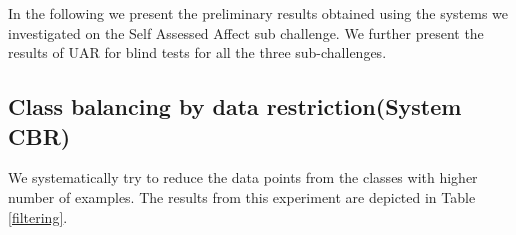 In the following we present the preliminary  results obtained using the systems we investigated on the Self Assessed Affect sub challenge. We further present the results of UAR for blind tests for all the three sub-challenges. 


\begin{comment}

\begin{table}[h]
\centering
\caption{UAR for data filtering experiments}
\label{filtering}
\begin{tabular}{@{}lllr@{}}\toprule
\multicolumn{3}{l}{Data split}                                           & UAR[\SI{}{\percent}]    \\ \cmidrule{1-4}
\multirow{6}{*}{100\% Low} & \multirow{3}{*}{100\% High}   & 90\% Medium & \SI{56.8}{} \\
                           &                               & 70\% Medium & \SI{55.0}{} \\
                           &                               & 40\% Medium & \SI{52.1}{} \\ \cmidrule{2-4}
                           & \multirow{3}{*}{100\% Medium} & 90\% High   & \textbf{\SI[detect-weight]{59.1}{}} \\
                           &                               & 70\% High   & \SI{56.8}{} \\
                           &                               & 40\% High   & \SI{51.5}{} \\ \cmidrule{1-4}
\multicolumn{3}{l}{All Data}                                             & \SI{57.2}{} \\
\bottomrule
\end{tabular}
\end{table}
\end{comment}
\subsection{Class balancing by data restriction(System CBR)}

 We systematically try to reduce the data points from the classes with higher number of examples. The results from this experiment are depicted in Table \ref{filtering}. 


